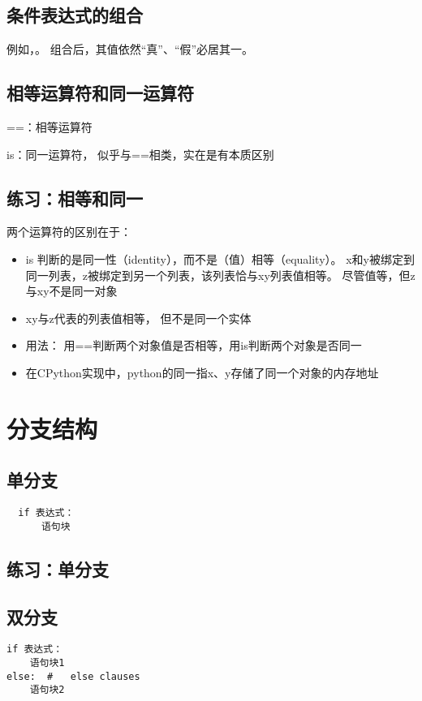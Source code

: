 \subsection{条件表达式的组合}
例如，。 组合后，其值依然“真”、“假”必居其一。
\subsection{相等运算符和同一运算符}
\begin{description}
\item{==：}相等运算符
\item{is：}同一运算符， 似乎与==相类，实在是有本质区别
\end{description}
\subsection{练习：相等和同一}
两个运算符的区别在于：
\begin{itemize}
\item is 判断的是同一性（identity），而不是（值）相等（equality）。 x和y被绑定到同一列表，z被绑定到另一个列表，该列表恰与xy列表值相等。 尽管值等，但z与xy不是同一对象
\item xy与z代表的列表值相等， 但不是同一个实体
\item 用法： 用==判断两个对象值是否相等，用is判断两个对象是否同一
\item 在CPython实现中，python的同一指x、y存储了同一个对象的内存地址
\end{itemize}

\section{分支结构}
\subsection{单分支}
\begin{framed}
\begin{verbatim}
  if 表达式：
      语句块
\end{verbatim}
\end{framed}
\subsection{练习：单分支}
\subsection{双分支}
\begin{framed}
\begin{verbatim}
if 表达式：
    语句块1
else:  #   else clauses
    语句块2
\end{verbatim}
\end{framed}
